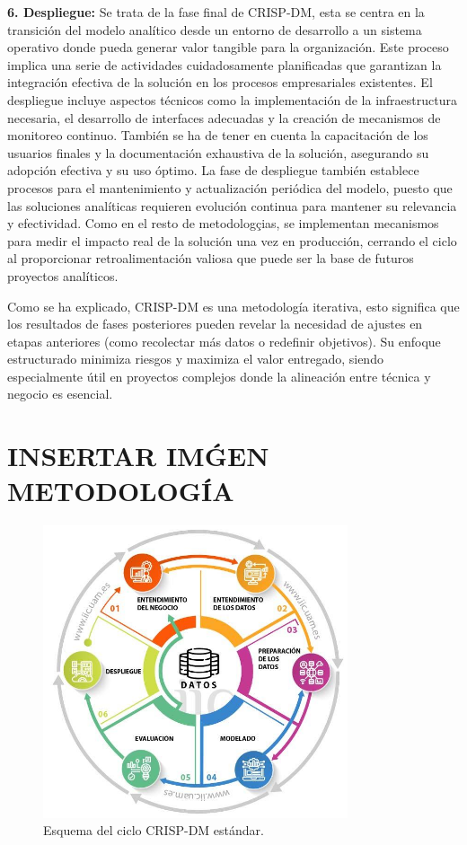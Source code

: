 \textbf{6. Despliegue:} Se trata de la fase final de CRISP-DM, esta se centra en la transición del modelo analítico desde un entorno de desarrollo a un sistema operativo donde pueda generar valor tangible para la organización. Este proceso implica una serie de actividades cuidadosamente planificadas que garantizan la integración efectiva de la solución en los procesos empresariales existentes. El despliegue incluye aspectos técnicos como la implementación de la infraestructura necesaria, el desarrollo de interfaces adecuadas y la creación de mecanismos de monitoreo continuo. También se ha de tener en cuenta la capacitación de los usuarios finales y la documentación exhaustiva de la solución, asegurando su adopción efectiva y su uso óptimo. La fase de despliegue también establece procesos para el mantenimiento y actualización periódica del modelo, puesto que las soluciones analíticas requieren evolución continua para mantener su relevancia y efectividad. Como en el resto de metodologçias, se implementan mecanismos para medir el impacto real de la solución una vez en producción, cerrando el ciclo al proporcionar retroalimentación valiosa que puede ser la base de futuros proyectos analíticos.

Como se ha explicado, CRISP-DM es una metodología iterativa, esto significa que los resultados de fases posteriores pueden revelar la necesidad de ajustes en etapas anteriores (como recolectar más datos o redefinir objetivos). Su enfoque estructurado minimiza riesgos y maximiza el valor entregado, siendo especialmente útil en proyectos complejos donde la alineación entre técnica y negocio es esencial.

\section{INSERTAR IMǴEN METODOLOGÍA}
\begin{figure}[htbp]
    \centering
    \includegraphics[width=0.8\textwidth]{./img/metodologia/crispdm.jpeg}
    \caption{Esquema del ciclo CRISP-DM estándar.}
    \label{fig:CRISP-DM}
\end{figure}